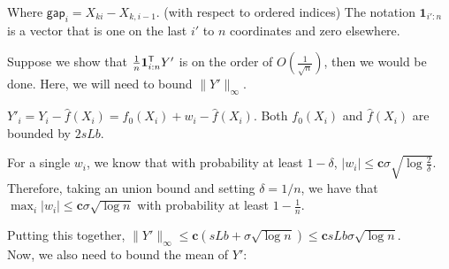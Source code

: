 \documentclass{article}
\begin{document}
Where $\mathsf{gap}_i = X_{ki} - X_{k,i-1}$. (with respect to ordered indices) The notation $\mathbf{1}_{i':n}$ is a vector that is one on the last $i'$ to $n$ coordinates and zero elsewhere.

Suppose we show that $\frac{1}{n} \mathbf{1}_{i:n}^{\mathsf{T}} Y'$ is on the order of $O( \frac{1}{\sqrt{n}})$, then we would be done. Here, we will need to bound $\| Y' \|_\infty$.

$Y'_i = Y_i - \hat{f}(X_i) = f_0(X_i) + w_i - \hat{f}(X_i)$. Both $f_0(X_i)$ and $\hat{f}(X_i)$ are bounded by $2 sLb$. 

For a single $w_i$, we know that with probability at least $1-\delta$, $|w_i| \leq \mathbf{c} \sigma \sqrt{ \log \frac{2}{\delta} }$. Therefore, taking an union bound and setting $\delta = 1/n$, we have that $\max_i |w_i| \leq \mathbf{c} \sigma \sqrt{\log n} $ with probability at least $1 - \frac{1}{n}$. 

Putting this together, $\| Y' \|_\infty \leq \mathbf{c}(sLb + \sigma\sqrt{\log n}) \leq
 \mathbf{c} sLb \sigma\sqrt{\log n}$.\\

Now, we also need to bound the mean of $Y'$: 
\end{document}
